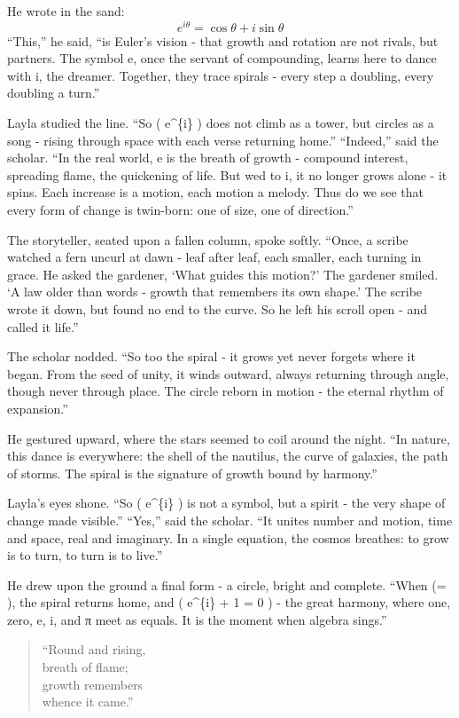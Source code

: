 \documentclass[
  letterpaper,
  DIV=11,
  numbers=noendperiod]{scrreprt}
\begin{document}
He wrote in the sand: \[
e^{i\theta} = \cos \theta + i \sin \theta
\] ``This,'' he said, ``is Euler's vision - that growth and rotation are
not rivals, but partners. The symbol e, once the servant of compounding,
learns here to dance with i, the dreamer. Together, they trace spirals -
every step a doubling, every doubling a turn.''

Layla studied the line. ``So ( e\^{}\{i\theta\} ) does not climb as a
tower, but circles as a song - rising through space with each verse
returning home.'' ``Indeed,'' said the scholar. ``In the real world, e
is the breath of growth - compound interest, spreading flame, the
quickening of life. But wed to i, it no longer grows alone - it spins.
Each increase is a motion, each motion a melody. Thus do we see that
every form of change is twin-born: one of size, one of direction.''

The storyteller, seated upon a fallen column, spoke softly. ``Once, a
scribe watched a fern uncurl at dawn - leaf after leaf, each smaller,
each turning in grace. He asked the gardener, `What guides this motion?'
The gardener smiled. `A law older than words - growth that remembers its
own shape.' The scribe wrote it down, but found no end to the curve. So
he left his scroll open - and called it life.''

The scholar nodded. ``So too the spiral - it grows yet never forgets
where it began. From the seed of unity, it winds outward, always
returning through angle, though never through place. The circle reborn
in motion - the eternal rhythm of expansion.''

He gestured upward, where the stars seemed to coil around the night.
``In nature, this dance is everywhere: the shell of the nautilus, the
curve of galaxies, the path of storms. The spiral is the signature of
growth bound by harmony.''

Layla's eyes shone. ``So ( e\^{}\{i\theta\} ) is not a symbol, but a
spirit - the very shape of change made visible.'' ``Yes,'' said the
scholar. ``It unites number and motion, time and space, real and
imaginary. In a single equation, the cosmos breathes: to grow is to
turn, to turn is to live.''

He drew upon the ground a final form - a circle, bright and complete.
``When (\theta = \pi), the spiral returns home, and ( e\^{}\{i\pi\} + 1
= 0 ) - the great harmony, where one, zero, e, i, and π meet as equals.
It is the moment when algebra sings.''

\begin{quote}
``Round and rising,\\
breath of flame;\\
growth remembers\\
whence it came.''
\end{quote}
\end{document}

